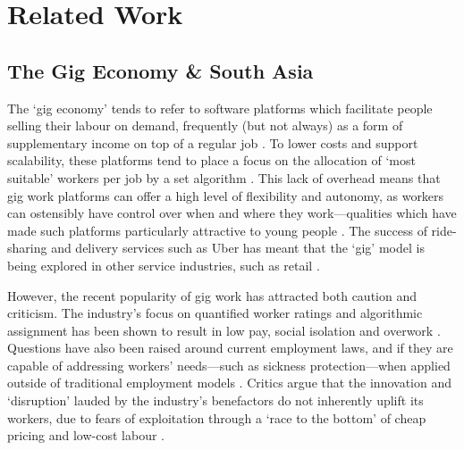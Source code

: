 \section{Related Work}

\subsection{The Gig Economy \& South Asia}

The `gig economy' tends to refer to software platforms which facilitate people selling their labour on demand, frequently (but not always) as a form of supplementary income on top of a regular job \cite{Taylor2017}. To lower costs and support scalability, these platforms tend to place a focus on the allocation of `most suitable' workers per job by a set algorithm \cite{Wood2019}. This lack of overhead means that gig work platforms can offer a high level of flexibility and autonomy, as workers can ostensibly have control over when and where they work---qualities which have made such platforms particularly attractive to young people \cite{Wood2019, Balaram2017, carlos2021}. The success of ride-sharing and delivery services such as Uber has meant that the `gig' model is being explored in other service industries, such as retail \cite{Balaram2017}. 

However, the recent popularity of gig work has attracted both caution and criticism. The industry's focus on quantified worker ratings and algorithmic assignment has been shown to result in low pay, social isolation and overwork \cite{Wood2019}. Questions have also been raised around current employment laws, and if they are capable of addressing workers' needs---such as sickness protection---when applied outside of traditional employment models \cite{Taylor2017}. Critics argue that the innovation and `disruption' lauded by the industry's benefactors do not inherently uplift its workers, due to fears of exploitation through a `race to the bottom' of cheap pricing and low-cost labour \cite{Balaram2017}.

